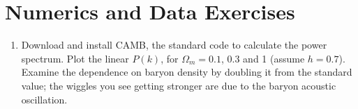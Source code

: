 \section{Numerics and Data Exercises}

\begin{enumerate}
\item Download and install CAMB, the standard code to calculate the
power spectrum. Plot the linear $P(k)$, for $\Omega_m= 0.1$, $0.3$ and
1 (assume $h=0.7$). Examine the dependence on baryon density by
doubling it from the standard value; the wiggles you see getting
stronger are due to the baryon acoustic oscillation.
\end{enumerate}


  
